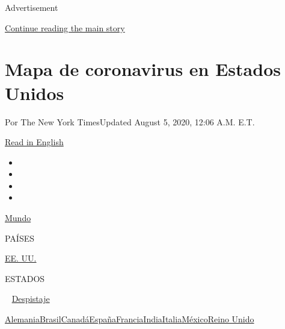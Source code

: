 Advertisement

\protect\hyperlink{after-top}{Continue reading the main story}

\hypertarget{mapa-de-coronavirus-en-estados-unidos}{%
\section{Mapa de coronavirus en Estados
Unidos}\label{mapa-de-coronavirus-en-estados-unidos}}

Por The New York TimesUpdated August 5, 2020, 12:06 A.M. E.T.

\href{https://www.nytimes3xbfgragh.onion/interactive/2020/us/coronavirus-us-cases.html}{Read
in English}

\begin{itemize}
\item
\item
\item
\item
\end{itemize}

\href{https://www.nytimes3xbfgragh.onion/interactive/2020/world/coronavirus-maps.html}{Mundo}~

PAÍSES

\textbar{}
\href{https://www.nytimes3xbfgragh.onion/es/interactive/2020/espanol/mundo/coronavirus-en-estados-unidos.html}{EE.
UU.}~

ESTADOS

~
\href{https://www.nytimes3xbfgragh.onion/interactive/2020/us/coronavirus-testing.html}{Despistaje}

\href{https://www.nytimes3xbfgragh.onion/interactive/2020/world/europe/germany-coronavirus-cases.html}{Alemania}\href{https://www.nytimes3xbfgragh.onion/interactive/2020/world/americas/brazil-coronavirus-cases.html}{Brasil}\href{https://www.nytimes3xbfgragh.onion/interactive/2020/world/canada/canada-coronavirus-cases.html}{Canadá}\href{https://www.nytimes3xbfgragh.onion/interactive/2020/world/europe/spain-coronavirus-cases.html}{España}\href{https://www.nytimes3xbfgragh.onion/interactive/2020/world/europe/france-coronavirus-cases.html}{Francia}\href{https://www.nytimes3xbfgragh.onion/interactive/2020/world/asia/india-coronavirus-cases.html}{India}\href{https://www.nytimes3xbfgragh.onion/interactive/2020/world/europe/italy-coronavirus-cases.html}{Italia}\href{https://www.nytimes3xbfgragh.onion/es/interactive/2020/espanol/america-latina/coronavirus-en-mexico.html}{México}\href{https://www.nytimes3xbfgragh.onion/interactive/2020/world/europe/united-kingdom-coronavirus-cases.html}{Reino
Unido}

